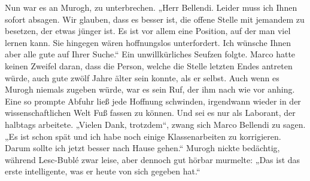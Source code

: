 Nun war es an Murogh, zu unterbrechen. „Herr Bellendi. Leider muss ich Ihnen sofort absagen. Wir glauben, dass es besser ist, die offene Stelle mit jemandem zu besetzen, der etwas jünger ist. Es ist vor allem eine Position, auf der man viel lernen kann. Sie hingegen wären hoffnungslos unterfordert. Ich wünsche Ihnen aber alle gute auf Ihrer Suche.“
Ein unwillkürliches Seufzen folgte. Marco hatte keinen Zweifel daran, dass die Person, welche die Stelle letzten Endes antreten würde, auch gute zwölf Jahre älter sein konnte, als er selbst. Auch wenn es Murogh niemals zugeben würde, war es sein Ruf, der ihm nach wie vor anhing. Eine so prompte Abfuhr ließ jede Hoffnung schwinden, irgendwann wieder in der wissenschaftlichen Welt Fuß fassen zu können. Und sei es nur als Laborant, der halbtags arbeitete.
„Vielen Dank, trotzdem“, zwang sich Marco Bellendi zu sagen. „Es ist schon spät und ich habe noch einige Klassenarbeiten zu korrigieren. Darum sollte ich jetzt besser nach Hause gehen.“
Murogh nickte bedächtig, während Lesc-Bublé zwar leise, aber dennoch gut hörbar murmelte: „Das ist das erste intelligente, was er heute von sich gegeben hat.“
